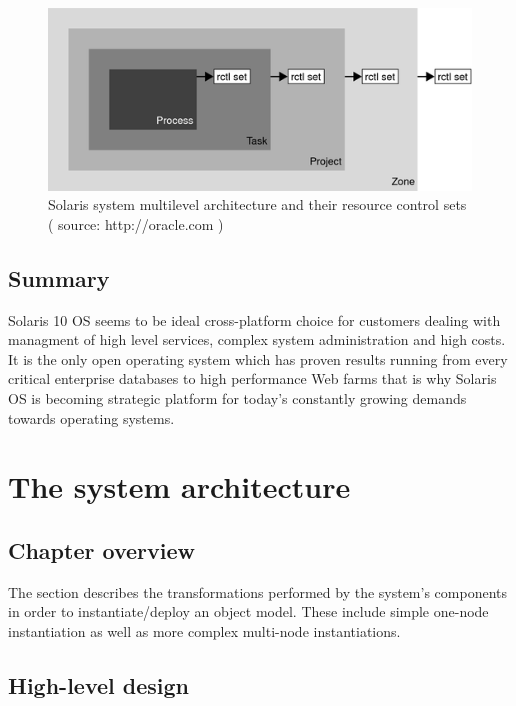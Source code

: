 \documentclass[11pt]{book}
\begin{document}
                \begin{figure}[H]
			\includegraphics[width=\textwidth]{img/rctrl.png}
			\caption{Solaris system multilevel architecture and their resource control sets ( source: http://oracle.com ) }
		\end{figure}
                

    \section*{Summary}

                Solaris 10 OS seems to be ideal cross-platform choice for customers dealing with managment of high level services, complex system administration and high costs. It is the only open operating system which has proven 
                results running from every critical enterprise databases to high performance Web farms that is why Solaris OS is becoming strategic platform for today's constantly growing demands towards operating systems. 
  \chapter{The system architecture}

    \section*{Chapter overview}

      The  section describes the transformations performed by the system's components in order to instantiate/deploy an object model. These include simple one-node instantiation as well as more complex multi-node instantiations.



    \section{High-level design}
\end{document}
